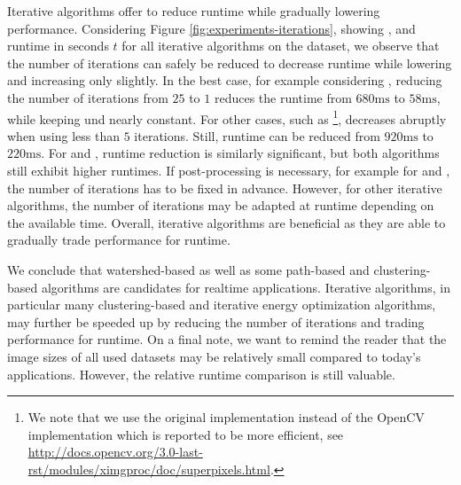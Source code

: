Iterative algorithms offer to reduce runtime while gradually lowering performance.
Considering Figure \ref{fig:experiments-iterations},
showing \Rec, \UE and runtime in seconds $t$ for all iterative algorithms on the \BSDS dataset,
we observe that the number of iterations can safely be reduced to decrease
runtime while lowering \Rec and increasing \UE only slightly. In the best case,
for example considering \ETPSr, reducing the number of iterations from $25$ to $1$
reduces the runtime from $680\text{ms}$ to $58\text{ms}$, while keeping \Rec und \UE
nearly constant. For other cases, such as \SEEDSr\footnote{
	We note that we use the original \SEEDS implementation instead of the
	OpenCV \cite{Bradski:2000} implementation which is reported to be more efficient, see
	\url{http://docs.opencv.org/3.0-last-rst/modules/ximgproc/doc/superpixels.html}.
}, \Rec decreases abruptly when
using less than $5$ iterations. Still, runtime can be reduced from $920\text{ms}$
to $220\text{ms}$. For \CRSr and \CISr, runtime reduction is similarly significant,
but both algorithms still exhibit higher runtimes. If post-processing
is necessary, for example for \SLICr and \preSLICr, the number of iterations has
to be fixed in advance. However, for other iterative algorithms, the number of
iterations may be adapted at runtime depending on the available time.
Overall, iterative algorithms are beneficial as they are able to gradually
trade performance for runtime.

We conclude that watershed-based as well as some path-based and clustering-based
algorithms are candidates for realtime applications. Iterative algorithms,
in particular many clustering-based and iterative energy optimization algorithms, may
further be speeded up by reducing the number of iterations and trading performance for
runtime. On a final note, we want to remind the reader that the image sizes of all
used datasets may be relatively small compared to today's applications.
However, the relative runtime comparison is still valuable.
